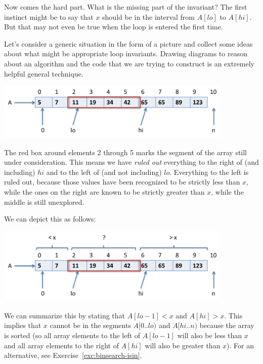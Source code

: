 Now comes the hard part.  What is the missing part of the invariant?
The first instinct might be to say that $x$ should be in the interval
from $A[\mathit{lo}]$ to $A[\mathit{hi}]$.  But that may not
even be true when the loop is entered the first time.

Let's consider a generic situation in the form of a picture and
collect some ideas about what might be appropriate loop invariants.
Drawing diagrams to reason about an algorithm and the code that we are
trying to construct is an extremely helpful general technique.
\begin{center}
\includegraphics[width=0.85\textwidth]{img/binsearch1.png}
\end{center}

The red box around elements 2 through 5 marks the segment of the array still
under consideration.  This means we have \emph{ruled out} everything to the
right of (and including) $\mathit{hi}$ and to the left of (and not including)
$\mathit{lo}$.  Everything to the left is ruled out, because those values have
been recognized to be strictly less than $x$, while the ones on the right are
known to be strictly greater than $x$, while the middle is still unexplored.

We can depict this as follows:
\begin{center}
\includegraphics[width=0.85\textwidth]{img/binsearch2.png}
\end{center}

We can summarize this by stating that $A[\mathit{lo}-1] < x$ and
$A[\mathit{hi}] > x$.  This implies that $x$ cannot be in the
segments $A\lbrack 0{..}\mathit{lo})$ and $A\lbrack \mathit{hi}{..}n)$ because the
array is sorted (so all array elements to the left of
$A[\mathit{lo}-1]$ will also be less than $x$ and all array
elements to the right of $A[\mathit{hi}]$ will also be greater than
$x$).  For an alternative, see Exercise~\ref{exc:binsearch-isin}.

